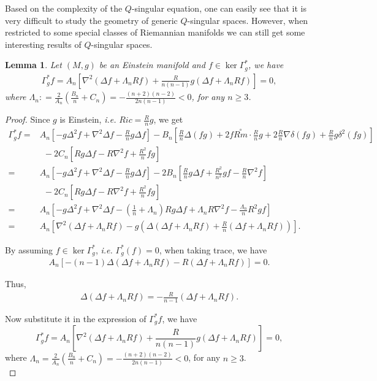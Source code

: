 \documentclass[12pt]{amsart}
\newtheorem{lemma}[theorem]{Lemma}
\theoremstyle{definition}
\theoremstyle{remark}
\numberwithin{equation}{section}
\begin{document}
Based on the complexity of the $Q$-singular equation, one can easily see that it is very difficult to study the geometry of generic $Q$-singular spaces. However, when restricted to some special classes of Riemannian manifolds we can still get some interesting results of $Q$-singular spaces.

\begin{lemma}\label{Q-static_Einstein}
Let $(M,g)$ be an Einstein manifold and $f \in \ker \Gamma_g^*$, we have
\begin{align}
\Gamma_g^* f = A_n \left[ \nabla^2 \left(\Delta f + \Lambda_n R f
\right) + \frac{R}{n(n-1)}g \left(\Delta f + \Lambda_n R f\right)
\right] = 0,
\end{align}
where $\Lambda_n : = \frac{2}{A_n} (\frac{B_n}{n} + C_n) = - \frac{(n+2)(n-2)}{2n(n-1)} < 0$, for any $n \geq 3$.
\end{lemma}

\begin{proof}

Since $g$ is Einstein, \emph{i.e.} $Ric=\frac{R}{n}g$, we get
\begin{align*}
\Gamma_g^* f=&A_n \left[ -g\Delta^2f+\nabla^2\Delta f-\frac{R}{n}g\Delta f \right] -B_n\left[\frac{R}{n}\Delta (fg)+2f \overset\circ{Rm}\cdot \frac{R}{n}g + 2\frac{R}{n}\nabla\delta(fg) +\frac{R}{n}g\delta^2(fg) \right]\\
& \ \ -2C_n\left[Rg\Delta f-R\nabla^2f+\frac{R^2}{n}fg\right]\\
=&A_n \left[-g\Delta^2f+\nabla^2\Delta f-\frac{R}{n}g\Delta f\right] - 2B_n \left[ \frac{R}{n}g\Delta f+\frac{R^2}{n^2}gf - \frac{R}{n}\nabla^2f \right] \\
& \ \ -2C_n \left[ Rg\Delta f-R\nabla^2f+\frac{R^2}{n}fg \right]\\
=& A_n \left[-g\Delta^2f+\nabla^2\Delta f - \left(\frac{1}{n} + \Lambda_n\right) R g\Delta f + \Lambda_n R \nabla^2 f - \frac{\Lambda_n}{n}R^2 g f \right]\\
=& A_n \left[ \nabla^2 \left(\Delta f + \Lambda_n R f\right)  - g \left( \Delta \left(\Delta f + \Lambda_n R f\right) +\frac{R}{n}\left(\Delta f + \Lambda_n R f\right) \right) \right].
\end{align*}

By assuming $f\in \ker \Gamma_g^*$, \emph{i.e.} $\Gamma_g^*(f)=0$, when taking trace, we have
\begin{align*}
A_n \left[  - (n-1) \Delta \left(\Delta f + \Lambda_n R f\right) - R\left(\Delta f + \Lambda_n R f\right) \right] = 0.
\end{align*}

Thus,
\begin{align*}
\Delta \left(\Delta f + \Lambda_n R f\right) = - \frac{R}{n-1}\left(\Delta f + \Lambda_n R f\right).
\end{align*}

Now substitute it in the expression of $\Gamma_g^* f$, we have
$$
\Gamma_g^* f =A_n \left[ \nabla^2 \left(\Delta f + \Lambda_n R f\right) + \frac{R}{n(n-1)}g \left(\Delta f + \Lambda_n R f\right)\right] = 0,
$$
where $\Lambda_n= \frac{2}{A_n}\left(\frac{B_n}{n}+C_n\right) = - \frac{(n+2)(n-2)}{2n(n-1)} < 0$, for any $n \geq 3$.\\
\end{proof}
\end{document}
